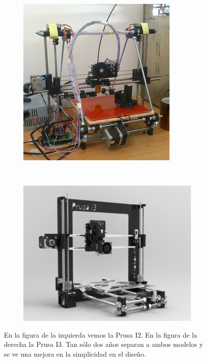 \begin{figure}[H]
	\centering
	\begin{subfigure}[b]{0.45\textwidth}
	    \centering
	     \includegraphics[width=\textwidth]{images/prusa_i2.jpg}
	    \label{fig:prusa2}
	\end{subfigure}
	~
	\begin{subfigure}[b]{0.45\textwidth}
	     \centering
	     \includegraphics[width=\textwidth]{images/prusa_i3.png}
	    \label{fig:prusa3}
	\end{subfigure}
	\caption[Evolución de las impresoras diseñadas por Josef Prusa.]{En la figura de la izquierda vemos la Prusa I2. En la figura de la derecha la Prusa I3. Tan sólo dos años separan a ambos modelos y se ve una mejora en la simplicidad en el diseño.}
	\label{fig:evol_prusa}
\end{figure}

